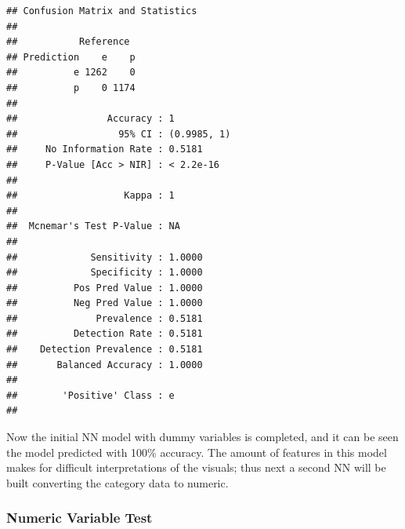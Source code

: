 \documentclass[
  english,
  man]{apa6}
\newenvironment{Shaded}{\begin{snugshade}}{\end{snugshade}}
\newcommand{\CommentTok}[1]{\textcolor[rgb]{0.56,0.35,0.01}{\textit{#1}}}
\newcommand{\DataTypeTok}[1]{\textcolor[rgb]{0.13,0.29,0.53}{#1}}
\newcommand{\DecValTok}[1]{\textcolor[rgb]{0.00,0.00,0.81}{#1}}
\newcommand{\KeywordTok}[1]{\textcolor[rgb]{0.13,0.29,0.53}{\textbf{#1}}}
\newcommand{\NormalTok}[1]{#1}
\newcommand{\OperatorTok}[1]{\textcolor[rgb]{0.81,0.36,0.00}{\textbf{#1}}}
\newcommand{\StringTok}[1]{\textcolor[rgb]{0.31,0.60,0.02}{#1}}
\begin{document}
\begin{Shaded}
\end{Shaded}

\begin{verbatim}
## Confusion Matrix and Statistics
## 
##           Reference
## Prediction    e    p
##          e 1262    0
##          p    0 1174
##                                      
##                Accuracy : 1          
##                  95% CI : (0.9985, 1)
##     No Information Rate : 0.5181     
##     P-Value [Acc > NIR] : < 2.2e-16  
##                                      
##                   Kappa : 1          
##                                      
##  Mcnemar's Test P-Value : NA         
##                                      
##             Sensitivity : 1.0000     
##             Specificity : 1.0000     
##          Pos Pred Value : 1.0000     
##          Neg Pred Value : 1.0000     
##              Prevalence : 0.5181     
##          Detection Rate : 0.5181     
##    Detection Prevalence : 0.5181     
##       Balanced Accuracy : 1.0000     
##                                      
##        'Positive' Class : e          
## 
\end{verbatim}

Now the initial NN model with dummy variables is completed, and it can be seen the model predicted with 100\% accuracy. The amount of features in this model makes for difficult interpretations of the visuals; thus next a second NN will be built converting the category data to numeric.

\hypertarget{numeric-variable-test}{%
\subsubsection{Numeric Variable Test}\label{numeric-variable-test}}
\end{document}
